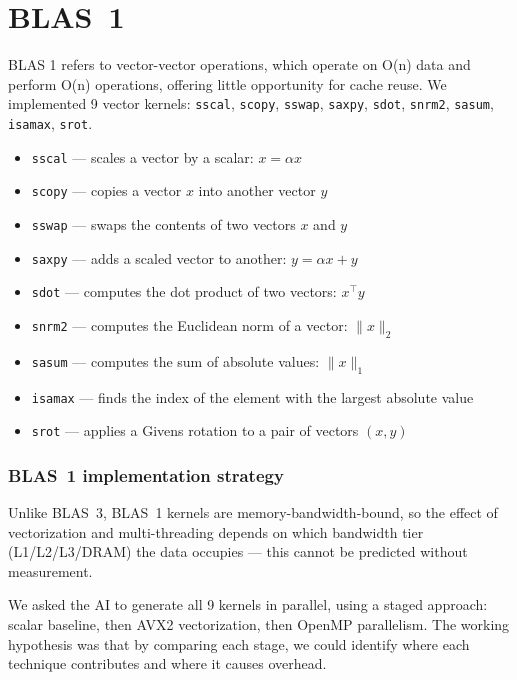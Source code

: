 \documentclass[11pt,a4paper]{article}
\begin{document}
\newpage
\part{BLAS~1}
BLAS 1 refers to vector-vector operations, which operate on O(n) data and perform O(n) operations, offering little opportunity for cache reuse. We implemented 9 vector kernels: \texttt{sscal}, \texttt{scopy}, \texttt{sswap}, \texttt{saxpy}, \texttt{sdot}, \texttt{snrm2}, \texttt{sasum}, \texttt{isamax}, \texttt{srot}.

\begin{itemize}
    \item \texttt{sscal} --- scales a vector by a scalar: $x = \alpha x$
    \item \texttt{scopy} --- copies a vector $x$ into another vector $y$
    \item \texttt{sswap} --- swaps the contents of two vectors $x$ and $y$
    \item \texttt{saxpy} --- adds a scaled vector to another: $y = \alpha x + y$
    \item \texttt{sdot} --- computes the dot product of two vectors: $x^\top y$
    \item \texttt{snrm2} --- computes the Euclidean norm of a vector: $\|x\|_2$
    \item \texttt{sasum} --- computes the sum of absolute values: $\|x\|_1$
    \item \texttt{isamax} --- finds the index of the element with the largest absolute value
    \item \texttt{srot} --- applies a Givens rotation to a pair of vectors $(x, y)$
\end{itemize}

\section{BLAS~1 implementation strategy}

Unlike BLAS~3, BLAS~1 kernels are memory-bandwidth-bound, so the effect of vectorization and multi-threading depends on which bandwidth tier (L1/L2/L3/DRAM) the data occupies — this cannot be predicted without measurement.

We asked the AI to generate all 9 kernels in parallel, using a staged approach: scalar baseline, then AVX2 vectorization, then OpenMP parallelism. The working hypothesis was that by comparing each stage, we could identify where each technique contributes and where it causes overhead.
\end{document}
